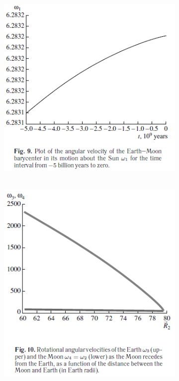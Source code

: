\documentclass[fontsize = 11pt,a4paper]{article}
\begin{document}
\begin{figure}[h!]
  \begin{subfigure}[t]{0.4\linewidth}
    \includegraphics[width=\linewidth]{graph5.png}
  \end{subfigure}
  \begin{subfigure}[t]{0.4\linewidth}
\hbox{\hspace{+9em}
    \includegraphics[width=\linewidth]{graph6.png}
}
  \end{subfigure}
\end{figure}

\begin{multicols}{2}

\end{multicols}
\thispagestyle{fancy}
\end{document}
